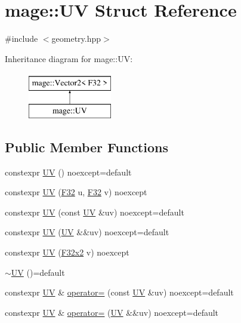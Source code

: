 \hypertarget{structmage_1_1_u_v}{}\section{mage\+:\+:UV Struct Reference}
\label{structmage_1_1_u_v}


{\ttfamily \#include $<$geometry.\+hpp$>$}

Inheritance diagram for mage\+:\+:UV\+:\begin{figure}[H]
\begin{center}
\leavevmode
\includegraphics[height=2.000000cm]{structmage_1_1_u_v}
\end{center}
\end{figure}
\subsection*{Public Member Functions}
\begin{DoxyCompactItemize}
\item 
constexpr \hyperlink{structmage_1_1_u_v_adc1ec1943378b391e1eeba840070b62c}{UV} () noexcept=default
\item 
constexpr \hyperlink{structmage_1_1_u_v_a383d9dff35f65343ea90284a07581b1f}{UV} (\hyperlink{namespacemage_aa97e833b45f06d60a0a9c4fc22ae02c0}{F32} u, \hyperlink{namespacemage_aa97e833b45f06d60a0a9c4fc22ae02c0}{F32} v) noexcept
\item 
constexpr \hyperlink{structmage_1_1_u_v_a2756ef5aa4b99bd8d8bce4b43c205e30}{UV} (const \hyperlink{structmage_1_1_u_v}{UV} \&uv) noexcept=default
\item 
constexpr \hyperlink{structmage_1_1_u_v_aea441530786bac9c6eb02bff653834bd}{UV} (\hyperlink{structmage_1_1_u_v}{UV} \&\&uv) noexcept=default
\item 
constexpr \hyperlink{structmage_1_1_u_v_ab5b287a94fef45b70f7c6d50ede33bff}{UV} (\hyperlink{namespacemage_aa87237ad091f5cd7da612b8523fc108f}{F32x2} v) noexcept
\item 
\hyperlink{structmage_1_1_u_v_a9389be8cc9bb64861b69f79b44b6dd1b}{$\sim$\+UV} ()=default
\item 
constexpr \hyperlink{structmage_1_1_u_v}{UV} \& \hyperlink{structmage_1_1_u_v_a53bf93c8a9b97f07d2b7db5a7e22be51}{operator=} (const \hyperlink{structmage_1_1_u_v}{UV} \&uv) noexcept=default
\item 
constexpr \hyperlink{structmage_1_1_u_v}{UV} \& \hyperlink{structmage_1_1_u_v_a2737f10decab84904fbd16a3f213c470}{operator=} (\hyperlink{structmage_1_1_u_v}{UV} \&\&uv) noexcept=default
\end{DoxyCompactItemize}


